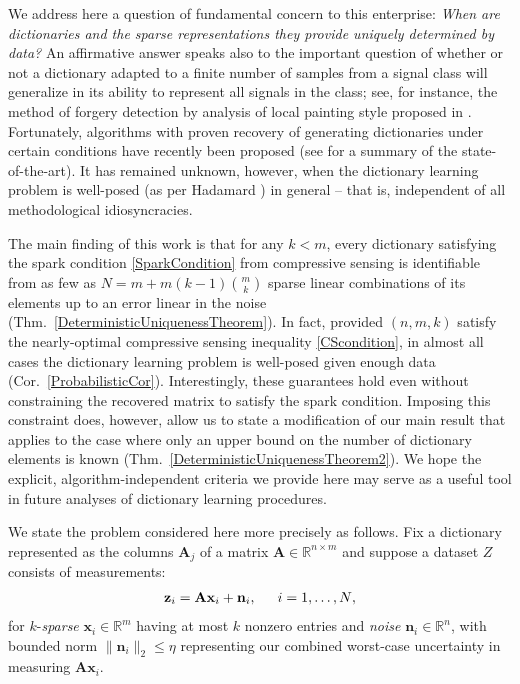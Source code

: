 \documentclass[9pt,twocolumn]{pnas-new}
\begin{document}
We address here a question of fundamental concern to this enterprise: \emph{When are dictionaries and the sparse representations they provide uniquely determined by data?} An affirmative answer speaks also to the important question of whether or not a dictionary adapted to a finite number of samples from a signal class will generalize in its ability to represent all signals in the class; see, for instance, the method of forgery detection by analysis of local painting style proposed in \cite{hughes2010, Olshausen10}. Fortunately, algorithms with proven recovery of generating dictionaries under certain conditions have recently been proposed (see \cite[Sec.~I-E]{Sun16} for a summary of the state-of-the-art). It has remained unknown, however, when the dictionary learning problem is well-posed (as per Hadamard \cite{Hadamard1902}) in general -- that is, independent of all methodological idiosyncracies.

The main finding of this work is that for any $k < m$, every dictionary satisfying the spark condition \eqref{SparkCondition} from compressive sensing is identifiable from as few as $N = m + m(k-1){m \choose k}$ sparse linear combinations of its elements up to an error linear in the noise (Thm.~\ref{DeterministicUniquenessTheorem}). In fact, provided $(n, m, k)$ satisfy the nearly-optimal compressive sensing inequality \eqref{CScondition}, in almost all cases the dictionary learning problem is well-posed given enough data (Cor.~\ref{ProbabilisticCor}). Interestingly, these guarantees hold even without constraining the recovered matrix to satisfy the spark condition. Imposing this constraint does, however, allow us to state a modification of our main result that applies to the case where only an upper bound on the number of dictionary elements is known (Thm.~\ref{DeterministicUniquenessTheorem2}). We hope the explicit, algorithm-independent criteria we provide here may serve as a useful tool in future analyses of dictionary learning procedures.

We state the problem considered here more precisely as follows. Fix a dictionary represented as the columns $\mathbf{A}_j$ of a matrix $\mathbf{A} \in \mathbb R^{n \times m}$ and suppose a dataset $Z$ consists of measurements:
\begin{align}\label{LinearModel}
\mathbf{z}_i = \mathbf{A}\mathbf{x}_i + \mathbf{n}_i,\indent \text{$i=1,\ldots,N$},
\end{align}
for $k$-\emph{sparse} $\mathbf{x}_i \in \mathbb{R}^m$ having at most $k$ nonzero entries and \emph{noise} $\mathbf{n}_i \in \mathbb{R}^n$, with bounded norm $\| \mathbf{n}_i \|_2 \leq  \eta$ representing our combined worst-case uncertainty in  measuring $\mathbf{A}\mathbf{x}_i$.
\end{document}
